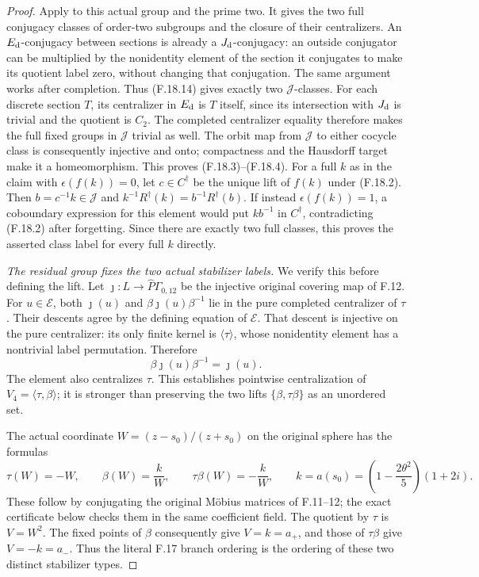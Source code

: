 \begin{proof}
Apply \cite[Theorem~A]{R-BZ} to this actual group
and the prime two.
It gives the two full conjugacy classes of
order-two subgroups and the closure of their
centralizers.  An $E_{\rm d}$-conjugacy between
sections is already a $J_{\rm d}$-conjugacy:
an outside conjugator can be multiplied by
the nonidentity element of the section it
conjugates to make its quotient label zero,
without changing that conjugation.
The same argument works after completion.
Thus (F.18.14) gives exactly two
$\mathcal J$-classes.
For each discrete section $T$, its centralizer
in $E_{\rm d}$ is $T$ itself, since its intersection
with $J_{\rm d}$ is trivial and the quotient is
$C_2$.  The completed centralizer equality therefore
makes the full fixed groups in $\mathcal J$
trivial as well.
The orbit map from $\mathcal J$ to either
cocycle class is consequently injective
and onto; compactness and the Hausdorff
target make it a homeomorphism.
This proves (F.18.3)--(F.18.4).
For a full $k$ as in the claim with
$\epsilon(f(k))=0$, let $c\in C^\dagger$
be the unique lift of $f(k)$ under (F.18.2).
Then $b=c^{-1}k\in\mathcal J$ and
$k^{-1}R^\dagger(k)=b^{-1}R^\dagger(b)$.
If instead $\epsilon(f(k))=1$, a coboundary
expression for this element would put
$kb^{-1}$ in $C^\dagger$, contradicting
(F.18.2) after forgetting.
Since there are exactly two full classes,
this proves the asserted class label for
every full $k$ directly.

\emph{The residual group fixes the two actual stabilizer labels.}
We verify this before defining the lift.
Let $\jmath:L\to\widehat P\Gamma_{0,12}$ be
the injective original covering map of F.12.
For $u\in\mathcal E$, both $\jmath(u)$ and
$\beta\jmath(u)\beta^{-1}$ lie in the pure
completed centralizer of $\tau$.
Their descents agree by the defining equation
of $\mathcal E$.  That descent is injective
on the pure centralizer: its only finite
kernel is $\langle\tau\rangle$, whose
nonidentity element has a nontrivial label
permutation.  Therefore
\[
                    \beta\jmath(u)\beta^{-1}=\jmath(u).
                                                               \tag{F.18.15}
\]
The element also centralizes $\tau$.
This establishes pointwise centralization
of $V_4=\langle\tau,\beta\rangle$; it is
stronger than preserving the two lifts
$\{\beta,\tau\beta\}$ as an unordered set.

The actual coordinate $W=(z-s_0)/(z+s_0)$
on the original sphere has the formulas
\[
 \tau(W)=-W,\qquad
 \beta(W)=\frac{k}{W},\qquad
 \tau\beta(W)=-\frac{k}{W},\qquad
 k=a(s_0)=\left(1-\frac{2\theta^2}{5}\right)(1+2i).
                                                               \tag{F.18.16}
\]
These follow by conjugating the original
M\"obius matrices of F.11--12; the exact
certificate below checks them in the
same coefficient field.
The quotient by $\tau$ is $V=W^2$.
The fixed points of $\beta$ consequently
give $V=k=a_+$, and those of $\tau\beta$
give $V=-k=a_-$.
Thus the literal F.17 branch ordering
is the ordering of these two distinct
stabilizer types.


\end{proof}
